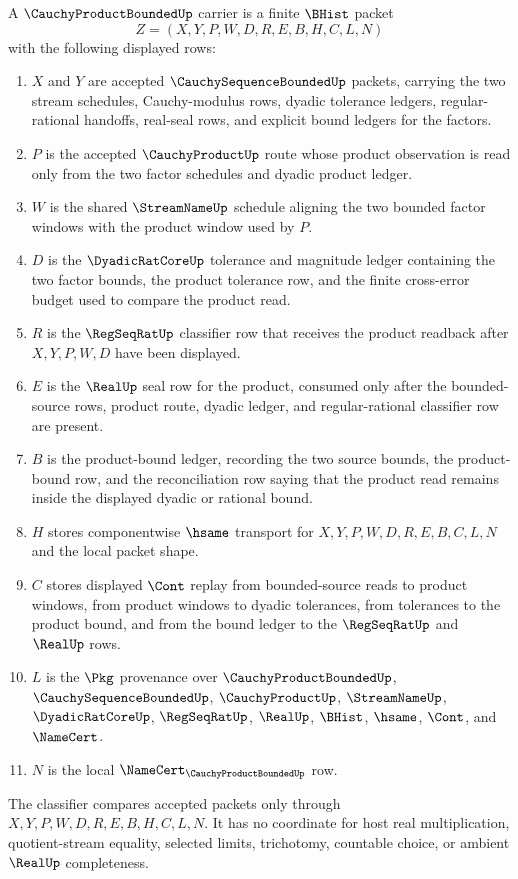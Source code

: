 \begin{definition}
\label{def:cauchy-product-bounded-carrier}
A $\CauchyProductBoundedUp$ carrier is a finite $\BHist$ packet
$$
Z=(X,Y,P,W,D,R,E,B,H,C,L,N)
$$
with the following displayed rows:
\begin{enumerate}
\item $X$ and $Y$ are accepted $\CauchySequenceBoundedUp$ packets, carrying the two stream schedules, Cauchy-modulus rows, dyadic tolerance ledgers, regular-rational handoffs, real-seal rows, and explicit bound ledgers for the factors.
\item $P$ is the accepted $\CauchyProductUp$ route whose product observation is read only from the two factor schedules and dyadic product ledger.
\item $W$ is the shared $\StreamNameUp$ schedule aligning the two bounded factor windows with the product window used by $P$.
\item $D$ is the $\DyadicRatCoreUp$ tolerance and magnitude ledger containing the two factor bounds, the product tolerance row, and the finite cross-error budget used to compare the product read.
\item $R$ is the $\RegSeqRatUp$ classifier row that receives the product readback after $X,Y,P,W,D$ have been displayed.
\item $E$ is the $\RealUp$ seal row for the product, consumed only after the bounded-source rows, product route, dyadic ledger, and regular-rational classifier row are present.
\item $B$ is the product-bound ledger, recording the two source bounds, the product-bound row, and the reconciliation row saying that the product read remains inside the displayed dyadic or rational bound.
\item $H$ stores componentwise $\hsame$ transport for $X,Y,P,W,D,R,E,B,C,L,N$ and the local packet shape.
\item $C$ stores displayed $\Cont$ replay from bounded-source reads to product windows, from product windows to dyadic tolerances, from tolerances to the product bound, and from the bound ledger to the $\RegSeqRatUp$ and $\RealUp$ rows.
\item $L$ is the $\Pkg$ provenance over $\CauchyProductBoundedUp$, $\CauchySequenceBoundedUp$, $\CauchyProductUp$, $\StreamNameUp$, $\DyadicRatCoreUp$, $\RegSeqRatUp$, $\RealUp$, $\BHist$, $\hsame$, $\Cont$, and $\NameCert$.
\item $N$ is the local $\NameCert_{\CauchyProductBoundedUp}$ row.
\end{enumerate}
The classifier compares accepted packets only through $X,Y,P,W,D,R,E,B,H,C,L,N$. It has no coordinate for host real multiplication, quotient-stream equality, selected limits, trichotomy, countable choice, or ambient $\RealUp$ completeness.
\end{definition}

